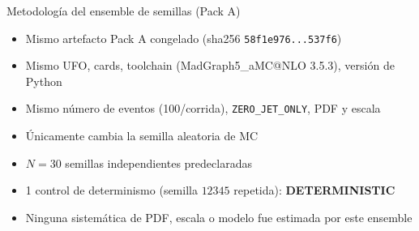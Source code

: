 \begin{frame}{Metodolog\'ia del ensemble de semillas (Pack A)}
  \begin{itemize}
    \item Mismo artefacto Pack A congelado (sha256 \texttt{58f1e976...537f6})
    \item Mismo UFO, cards, toolchain (MadGraph5\_aMC@NLO 3.5.3), versi\'on de Python
    \item Mismo n\'umero de eventos (100/corrida), \texttt{ZERO\_JET\_ONLY}, PDF y escala
    \item \'Unicamente cambia la semilla aleatoria de MC
    \item $N=30$ semillas independientes predeclaradas
    \item 1 control de determinismo (semilla $12345$ repetida): \textbf{DETERMINISTIC}
    \item Ninguna sistem\'atica de PDF, escala o modelo fue estimada por este ensemble
  \end{itemize}
\end{frame}
